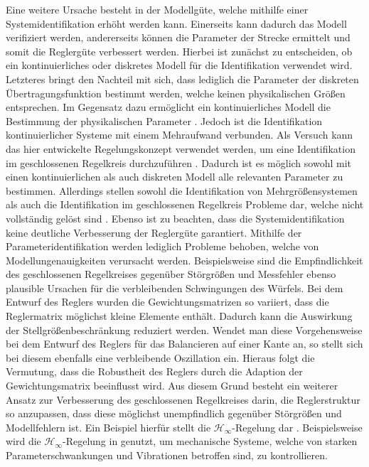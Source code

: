 Eine weitere Ursache besteht in der Modellgüte, welche mithilfe einer Systemidentifikation erhöht werden kann. Einerseits kann dadurch das Modell verifiziert werden, andererseits können die Parameter der Strecke ermittelt und somit die Reglergüte verbessert werden. Hierbei ist zunächst zu entscheiden, ob ein kontinuierliches oder diskretes Modell für die Identifikation verwendet wird. Letzteres bringt den Nachteil mit sich, dass lediglich die Parameter der diskreten Übertragungsfunktion bestimmt werden, welche keinen physikalischen Größen entsprechen. Im Gegensatz dazu ermöglicht ein kontinuierliches Modell die Bestimmung der physikalischen Parameter \cite[S. 189 ff.]{UnbehauenSysId}. Jedoch ist die Identifikation kontinuierlicher Systeme mit einem Mehraufwand verbunden.
Als Versuch kann das hier entwickelte Regelungskonzept verwendet werden, um eine Identifikation im geschlossenen Regelkreis durchzuführen \cite[S. 126 ff.]{UnbehauenSysId}. Dadurch ist es möglich sowohl mit einen kontinuierlichen als auch diskreten Modell alle relevanten Parameter zu bestimmen. Allerdings stellen sowohl die Identifikation von Mehrgrößensystemen als auch die Identifikation im geschlossenen Regelkreis Probleme dar, welche nicht vollständig gelöst sind \cite[S. 187 f.]{UnbehauenSysId}. Ebenso ist zu beachten, dass die Systemidentifikation keine deutliche Verbesserung der Reglergüte garantiert. Mithilfe der Parameteridentifikation werden lediglich Probleme behoben, welche von Modellungenauigkeiten verursacht werden. Beispielsweise sind die Empfindlichkeit des geschlossenen Regelkreises gegenüber Störgrößen und Messfehler ebenso plausible Ursachen für die verbleibenden Schwingungen des Würfels. 
Bei dem Entwurf des Reglers wurden die Gewichtungsmatrizen so variiert, dass die Reglermatrix möglichst kleine Elemente enthält. Dadurch kann die Auswirkung der Stellgrößenbeschränkung reduziert werden. Wendet man diese Vorgehensweise bei dem Entwurf des Reglers für das Balancieren auf einer Kante an, so stellt sich bei diesem ebenfalls eine verbleibende Oszillation ein. Hieraus folgt die Vermutung, dass die Robustheit des Reglers durch die Adaption der Gewichtungsmatrix beeinflusst wird.
Aus diesem Grund besteht ein weiterer Ansatz zur Verbesserung des geschlossenen Regelkreises darin, die Reglerstruktur so anzupassen, dass diese möglichst unempfindlich gegenüber Störgrößen und Modellfehlern ist. Ein Beispiel hierfür stellt die $\mathcal{H}_\infty$-Regelung dar \cite[S. 224 ff.]{Ludyk}. Beispielsweise wird die $\mathcal{H}_\infty$-Regelung in \cite{Toda} genutzt, um mechanische Systeme, welche von starken Parameterschwankungen und Vibrationen betroffen sind, zu kontrollieren. 


